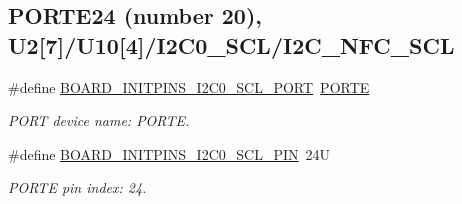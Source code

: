 \subsection*{P\+O\+R\+T\+E24 (number 20), U2\mbox{[}7\mbox{]}/\+U10\mbox{[}4\mbox{]}/\+I2\+C0\+\_\+\+S\+C\+L/\+I2\+C\+\_\+\+N\+F\+C\+\_\+\+S\+CL}
\begin{DoxyCompactItemize}
\item 
\mbox{\label{group__pin__mux_ga75e8c77c9d1e7b92bb3d2c32e023208e}} 
\#define \mbox{\hyperlink{group__pin__mux_ga75e8c77c9d1e7b92bb3d2c32e023208e}{B\+O\+A\+R\+D\+\_\+\+I\+N\+I\+T\+P\+I\+N\+S\+\_\+\+I2\+C0\+\_\+\+S\+C\+L\+\_\+\+P\+O\+RT}}~\mbox{\hyperlink{group___p_o_r_t___peripheral___access___layer_ga7e2386d3b1084b5b875ae3696f550ba9}{P\+O\+R\+TE}}
\begin{DoxyCompactList}\small\item\em P\+O\+RT device name\+: P\+O\+R\+TE. \end{DoxyCompactList}\item 
\mbox{\label{group__pin__mux_ga7363af335a97d38ecf402e32db7e1817}} 
\#define \mbox{\hyperlink{group__pin__mux_ga7363af335a97d38ecf402e32db7e1817}{B\+O\+A\+R\+D\+\_\+\+I\+N\+I\+T\+P\+I\+N\+S\+\_\+\+I2\+C0\+\_\+\+S\+C\+L\+\_\+\+P\+IN}}~24U
\begin{DoxyCompactList}\small\item\em P\+O\+R\+TE pin index\+: 24. \end{DoxyCompactList}\end{DoxyCompactItemize}

